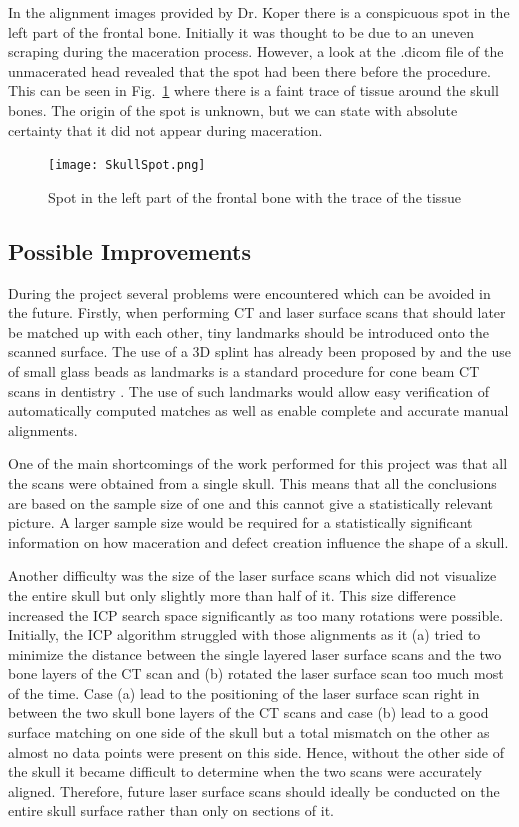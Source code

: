 \documentclass[a4paper]{article}
\begin{document}
In the alignment images provided by Dr. Koper there is a conspicuous spot in the left part of the frontal bone. Initially it was thought to be due to an uneven scraping during the maceration process. However, a look at the {\selectfont .dicom} file of the unmacerated head revealed that the spot had been there before the procedure. This can be seen in Fig.~\ref{fig:spot} where there is a faint trace of tissue around the skull bones.  The origin of the spot is unknown, but we can state with absolute certainty that it did not appear during maceration. 
\begin{figure} [ht!]
\centering
\texttt{[image: SkullSpot.png]}
\caption{\label{fig:spot} Spot in the left part of the frontal bone with the trace of the tissue}
\end{figure}
\pagebreak

\subsection{Possible Improvements} %
During the project several problems were encountered which can be avoided in the future. Firstly, when performing CT and laser surface scans that should later be matched up with each other, tiny landmarks should be introduced onto the scanned surface. The use of a 3D splint has already been proposed by \cite{swennen2007use} and the use of small glass beads as landmarks is a standard procedure for cone beam CT scans in dentistry \citep{fransdebeer}. The use of such landmarks would allow easy verification of automatically computed matches as well as enable complete and accurate manual alignments.

One of the main shortcomings of the work performed for this project was that all the scans were obtained from a single skull. This means that all the conclusions are based on the sample size of one and this cannot give a statistically relevant picture. A larger sample size would be required for a statistically significant information on how maceration and defect creation influence the shape of a skull. 

Another difficulty was the size of the laser surface scans which did not visualize the entire skull but only slightly more than half of it. This size difference increased the ICP search space significantly as too many rotations were possible. Initially, the ICP algorithm struggled with those alignments as it (a) tried to minimize the distance between the single layered laser surface scans and the two bone layers of the CT scan and (b) rotated the laser surface scan too much most of the time. Case (a) lead to the positioning of the laser surface scan right in between the two skull bone layers of the CT scans and case (b) lead to a good surface matching on one side of the skull but a total mismatch on the other as almost no data points were present on this side. Hence, without the other side of the skull it became difficult to determine when the two scans were accurately aligned. Therefore, future laser surface scans should ideally be conducted on the entire skull surface rather than only on sections of it.
\end{document}
